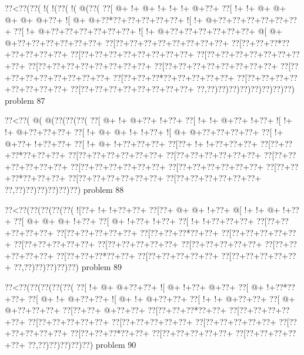 \vbox{\vbox{\goo
\0??<\0??(\0??(\- !(\- !(\0??(\- !(\- @(\0??(
\0??[\- @+\- !+\- @+\- !+\- !+\- !+\- @+\0??+
\0??[\- !+\- !+\- @+\- @+\- @+\- @+\- @+\0??+
\- ![\- @+\- @+\0??*\0??+\0??+\0??+\0??+\0??+
\- ![\- !+\- @+\0??+\0??+\0??+\0??+\0??+\0??+
\0??[\- !+\- @+\0??+\0??+\0??+\0??+\0??+\0??+
\- ![\- !+\- @+\0??+\0??+\0??+\0??+\0??+\0??+
\- @[\- @+\- @+\0??+\0??+\0??+\0??+\0??+\0??+
\0??[\0??+\0??+\0??+\0??+\0??+\0??+\0??+\0??+
\0??[\0??+\0??+\0??*\0??+\0??+\0??+\0??+\0??+
\0??[\0??+\0??+\0??+\0??+\0??+\0??+\0??+\0??+
\0??[\0??+\0??+\0??+\0??+\0??+\0??+\0??+\0??+
\0??[\0??+\0??+\0??+\0??+\0??+\0??+\0??+\0??+
\0??[\0??+\0??+\0??+\0??+\0??+\0??+\0??+\0??+
\0??[\0??+\0??+\0??+\0??+\0??+\0??+\0??+\0??+
\0??[\0??+\0??+\0??*\0??+\0??+\0??+\0??+\0??+
\0??[\0??+\0??+\0??+\0??+\0??+\0??+\0??+\0??+
\0??[\0??+\0??+\0??+\0??+\0??+\0??+\0??+\0??+
\0??,\0??)\0??)\0??)\0??)\0??)\0??)\0??)\0??)
}
\hfil problem 87\hfil\break
}

\vbox{\vbox{\goo
\0??<\0??(\- @(\- @(\0??(\0??(\0??(
\0??[\- @+\- !+\- @+\0??+\- !+\0??+
\0??[\- !+\- !+\- @+\0??+\- !+\0??+
\- ![\- !+\- !+\- @+\0??+\0??+\0??+
\0??[\- !+\- @+\- @+\- !+\- !+\0??+
\- ![\- @+\- @+\0??+\0??+\0??+\0??+
\0??[\- !+\- @+\0??+\- !+\0??+\0??+
\0??[\- !+\- @+\- !+\0??+\0??+\0??+
\0??[\0??+\- !+\- !+\0??+\0??+\0??+
\0??[\0??+\0??+\0??*\0??+\0??+\0??+
\0??[\0??+\0??+\0??+\0??+\0??+\0??+
\0??[\0??+\0??+\0??+\0??+\0??+\0??+
\0??[\0??+\0??+\0??+\0??+\0??+\0??+
\0??[\0??+\0??+\0??+\0??+\0??+\0??+
\0??[\0??+\0??+\0??+\0??+\0??+\0??+
\0??[\0??+\0??+\0??*\0??+\0??+\0??+
\0??[\0??+\0??+\0??+\0??+\0??+\0??+
\0??[\0??+\0??+\0??+\0??+\0??+\0??+
\0??,\0??)\0??)\0??)\0??)\0??)\0??)
}
\hfil problem 88\hfil\break
}

\vbox{\vbox{\goo
\0??<\0??(\0??(\0??(\0??(\0??(
\- ![\0??+\- !+\- !+\0??+\0??+
\0??[\0??+\- @+\- @+\- !+\0??+
\- @[\- !+\- !+\- @+\- !+\0??+
\0??[\- @+\- @+\- @+\- !+\0??+
\0??[\- @+\- !+\0??+\- !+\0??+
\0??[\- !+\- !+\0??+\0??+\0??+
\0??[\0??+\0??+\0??+\0??+\0??+
\0??[\0??+\0??+\0??+\0??+\0??+
\0??[\0??+\0??+\0??*\0??+\0??+
\0??[\0??+\0??+\0??+\0??+\0??+
\0??[\0??+\0??+\0??+\0??+\0??+
\0??[\0??+\0??+\0??+\0??+\0??+
\0??[\0??+\0??+\0??+\0??+\0??+
\0??[\0??+\0??+\0??+\0??+\0??+
\0??[\0??+\0??+\0??*\0??+\0??+
\0??[\0??+\0??+\0??+\0??+\0??+
\0??[\0??+\0??+\0??+\0??+\0??+
\0??,\0??)\0??)\0??)\0??)\0??)
}
\hfil problem 89\hfil\break
}

\vbox{\vbox{\goo
\0??<\0??(\0??(\0??(\0??(\0??(
\0??[\- !+\- @+\- @+\0??+\0??+
\- ![\- @+\- !+\0??+\- @+\0??+
\0??[\- @+\- !+\0??*\0??+\0??+
\0??[\- @+\- !+\- @+\0??+\0??+
\- ![\- @+\- !+\- @+\0??+\0??+
\0??[\- !+\- !+\- @+\0??+\0??+
\0??[\- @+\- @+\0??+\0??+\0??+
\0??[\0??+\0??+\- @+\0??+\0??+
\0??[\0??+\0??+\0??*\0??+\0??+
\0??[\0??+\0??+\0??+\0??+\0??+
\0??[\0??+\0??+\0??+\0??+\0??+
\0??[\0??+\0??+\0??+\0??+\0??+
\0??[\0??+\0??+\0??+\0??+\0??+
\0??[\0??+\0??+\0??+\0??+\0??+
\0??[\0??+\0??+\0??*\0??+\0??+
\0??[\0??+\0??+\0??+\0??+\0??+
\0??[\0??+\0??+\0??+\0??+\0??+
\0??,\0??)\0??)\0??)\0??)\0??)
}
\hfil problem 90\hfil\break
}

